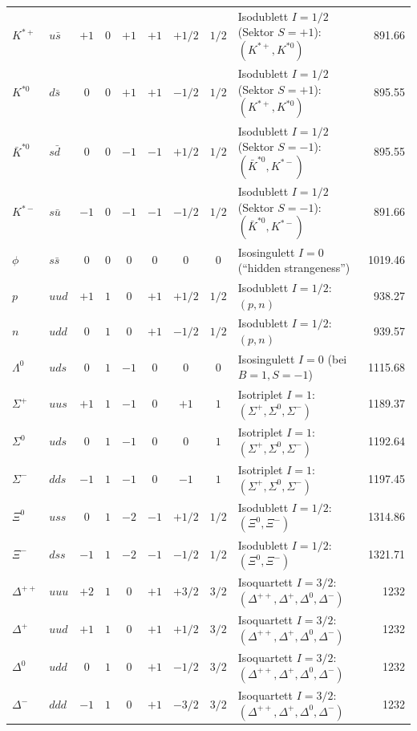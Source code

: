 \documentclass[10pt, letterpaper]{article}
\begin{document}
\begin{longtable}{@{}p{1.5cm}p{2cm}c c c c c c p{3.6cm}r@{}}
$K^{*+}$ & $u\bar s$ & $+1$ & $0$ & $+1$ & $+1$ & $+1/2$ & $1/2$ &
Isodublett $I=1/2$ (Sektor $S=+1$): $(K^{*+},K^{*0})$ & 891.66
\\
$K^{*0}$ & $d\bar s$ & $0$ & $0$ & $+1$ & $+1$ & $-1/2$ & $1/2$ &
Isodublett $I=1/2$ (Sektor $S=+1$): $(K^{*+},K^{*0})$ & 895.55
\\
$\bar K^{*0}$ & $s\bar d$ & $0$ & $0$ & $-1$ & $-1$ & $+1/2$ & $1/2$ &
Isodublett $I=1/2$ (Sektor $S=-1$): $(\bar K^{*0},K^{*-})$ & 895.55
\\
$K^{*-}$ & $s\bar u$ & $-1$ & $0$ & $-1$ & $-1$ & $-1/2$ & $1/2$ &
Isodublett $I=1/2$ (Sektor $S=-1$): $(\bar K^{*0},K^{*-})$ & 891.66
\\[2pt]

$\phi$ & $s\bar s$ & $0$ & $0$ & $0$ & $0$ & $0$ & $0$ &
Isosingulett $I=0$ (``hidden strangeness'') & 1019.46
\\[8pt]



$p$ & $uud$ & $+1$ & $1$ & $0$ & $+1$ & $+1/2$ & $1/2$ &
Isodublett $I=1/2$: $(p,n)$ & 938.27
\\
$n$ & $udd$ & $0$ & $1$ & $0$ & $+1$ & $-1/2$ & $1/2$ &
Isodublett $I=1/2$: $(p,n)$ & 939.57
\\[2pt]

$\Lambda^0$ & $uds$ & $0$ & $1$ & $-1$ & $0$ & $0$ & $0$ &
Isosingulett $I=0$ (bei $B=1,S=-1$) & 1115.68
\\[2pt]

$\Sigma^+$ & $uus$ & $+1$ & $1$ & $-1$ & $0$ & $+1$ & $1$ &
Isotriplet $I=1$: $(\Sigma^+,\Sigma^0,\Sigma^-)$ & 1189.37
\\
$\Sigma^0$ & $uds$ & $0$ & $1$ & $-1$ & $0$ & $0$ & $1$ &
Isotriplet $I=1$: $(\Sigma^+,\Sigma^0,\Sigma^-)$ & 1192.64
\\
$\Sigma^-$ & $dds$ & $-1$ & $1$ & $-1$ & $0$ & $-1$ & $1$ &
Isotriplet $I=1$: $(\Sigma^+,\Sigma^0,\Sigma^-)$ & 1197.45
\\[2pt]

$\Xi^0$ & $uss$ & $0$ & $1$ & $-2$ & $-1$ & $+1/2$ & $1/2$ &
Isodublett $I=1/2$: $(\Xi^0,\Xi^-)$ & 1314.86
\\
$\Xi^-$ & $dss$ & $-1$ & $1$ & $-2$ & $-1$ & $-1/2$ & $1/2$ &
Isodublett $I=1/2$: $(\Xi^0,\Xi^-)$ & 1321.71
\\[6pt]

$\Delta^{++}$ & $uuu$ & $+2$ & $1$ & $0$ & $+1$ & $+3/2$ & $3/2$ &
Isoquartett $I=3/2$: $(\Delta^{++},\Delta^+,\Delta^0,\Delta^-)$ & 1232
\\
$\Delta^{+}$ & $uud$ & $+1$ & $1$ & $0$ & $+1$ & $+1/2$ & $3/2$ &
Isoquartett $I=3/2$: $(\Delta^{++},\Delta^+,\Delta^0,\Delta^-)$ & 1232
\\
$\Delta^{0}$ & $udd$ & $0$ & $1$ & $0$ & $+1$ & $-1/2$ & $3/2$ &
Isoquartett $I=3/2$: $(\Delta^{++},\Delta^+,\Delta^0,\Delta^-)$ & 1232
\\
$\Delta^{-}$ & $ddd$ & $-1$ & $1$ & $0$ & $+1$ & $-3/2$ & $3/2$ &
Isoquartett $I=3/2$: $(\Delta^{++},\Delta^+,\Delta^0,\Delta^-)$ & 1232
\\

\end{longtable}
\end{document}
